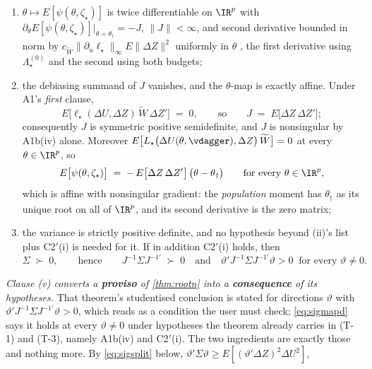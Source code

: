 \begin{lemma}[{The moment is valid, its variance is finite, its $\theta$-Jacobian is $-J$, and $J=E[\Delta Z\Delta Z']$}]
\begin{enumerate}
\item[(iii)] $\theta\mapsto E[\psi(\theta,\zeta_\star)]$ is twice differentiable on $\IR^{p}$ with
$\partial_\theta E[\psi(\theta,\zeta_\star)]\big|_{\theta=\theta_\dagger}=-J$, $\|J\|<\infty$, and second
derivative bounded in norm by $c_{\widetilde W}\|\partial_u\ell_\star\|_\infty E\|\Delta Z\|^{2}$ uniformly in $\theta$
, the first derivative using $\Lambda^{(0)}_\star$ and the second using both budgets;
\item[(iv)] the debiasing summand of $J$ vanishes, and the $\theta$-map is exactly affine. Under
A1's \emph{first} clause,
\[
E\big[\ell_\star(\Delta U,\Delta Z)\,\widetilde W\,\Delta Z'\big]\;=\;0,
\qquad\text{so}\qquad
J\;=\;E\big[\Delta Z\,\Delta Z'\big] ;
\]
consequently $J$ is symmetric positive semidefinite, and $J$ is nonsingular by A1b(iv) alone. Moreover
$E\big[L_\star\big(\Delta U(\theta,\vdagger),\Delta Z\big)\,\widetilde W\big]=0$ at every
$\theta\in\IR^{p}$, so
\begin{equation}\label{eq:psiaffine}
E\big[\psi(\theta,\zeta_\star)\big]\;=\;-\,E\big[\Delta Z\,\Delta Z'\big]\,\big(\theta-\theta_\dagger\big)
\qquad\text{for every }\theta\in\IR^{p} ,
\end{equation}
which is affine with nonsingular gradient: the \emph{population} moment has $\theta_\dagger$ as its unique
root on all of $\IR^{p}$, and its second derivative is the zero matrix;
\item[(v)] the variance is strictly positive definite, and no hypothesis beyond \textup{(ii)}'s list
plus C2$'$(i) is needed for it. If in addition C2$'$(i) holds, then
\begin{equation}\label{eq:sigmapd}
\Sigma\;\succ\;0,
\qquad\text{hence}\qquad
J^{-1}\Sigma J^{-1\prime}\;\succ\;0
\quad\text{and}\quad
\vartheta'J^{-1}\Sigma J^{-1\prime}\vartheta>0\ \text{ for every }\vartheta\ne0 .
\end{equation}
\end{enumerate}
\emph{Clause \textup{(v)} converts a \textbf{proviso} of \cref{thm:rootn} into
a \textbf{consequence} of its hypotheses.} That theorem's studentised conclusion is stated for directions
$\vartheta$ with $\vartheta'J^{-1}\Sigma J^{-1\prime}\vartheta>0$, which reads as a condition the user must
check; \eqref{eq:sigmapd} says it holds at every $\vartheta\ne0$ under hypotheses the theorem already
carries in (T-1) and (T-3), namely A1b(iv) and C2$'$(i). The two ingredients are exactly those and
nothing more. By \eqref{eq:sigsplit} below, $\vartheta'\Sigma\vartheta\ge E[(\vartheta'\Delta Z)^{2}\Delta U^{2}]$,

\end{lemma}
